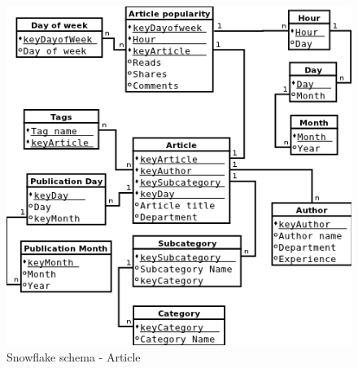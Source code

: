 \begin{figure}[!hbp]
    \includegraphics[scale=0.4]{schema_snowflake_article}
\caption{\label{pic:sn_art} Snowflake schema - Article}
\end{figure}

\clearpage
